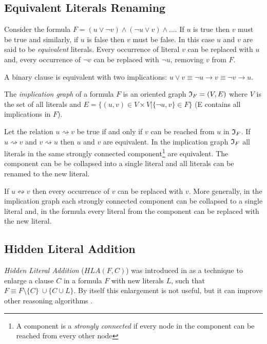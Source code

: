 \subsection{Equivalent Literals Renaming}
\label{ssec:eqlr}

Consider the formula $F = (u \lor \neg v) \land (\neg u \lor v) \land \ldots$.
If $u$ is true then $v$ must be true and similarly, if $u$ is false
then $v$ must be false. In this case $u$ and $v$ are said to be
\emph{equivalent} literals. Every occurrence of literal $v$ can be
replaced with $u$ and, every occurrence of $\neg v$ can be replaced
with $\neg u$, removing $v$ from $F$.

\begin{myprop}
  A binary clause is equivalent with two implications:
  $u \lor v \equiv \neg u \rightarrow v \equiv \neg v \rightarrow u$.
\end{myprop}

\begin{mydef}
  The \emph{implication graph} of a formula $F$ is an oriented graph
  $\mathfrak{I}_F = (V, E)$ where $V$ is the set of all literals and $E = \{(u,
  v) \in V \times V | \{\neg u, v\} \in F\}$ (E contains all implications in $F$).
\end{mydef}

Let the relation $u \rightsquigarrow v$ be true if and only if
$v$ can be reached from $u$ in $\mathfrak{I}_F$.  If $u \rightsquigarrow v$
and $v \rightsquigarrow u$ then $u$ and $v$ are equivalent.  In the
implication graph $\mathfrak{I}_F$ all literals in the same strongly connected
component\footnote{A component is a \emph{strongly connected}
if every node in the component can be reached from every other node}
are equivalent. The component can be be collapsed into a single
literal and all literals can be renamed to the new literal.

\begin{myprop}
  If $u \leftrightsquigarrow v$ then every occurrence of $v$ can be replaced
  with $v$. More generally, in the implication graph each strongly
  connected component can be collapsed to a single literal and, in
  the formula every literal from the component can be replaced with
  the new literal.
\end{myprop}


\subsection{Hidden Literal Addition}
\label{ssec:hla}

\emph{Hidden Literal Addition} ($HLA(F, C)$) was introduced in
\cite{Heule:2010:CEP:1928380.1928406} as a technique to enlarge a clause $C$
in a formula $F$ with new literals $L$, such that $F \equiv F \setminus \{C\} \
\cup \{ C \cup L \}$. By itself this enlargement is not useful, but it
can improve other reasoning algorithms \cite{Heule_coveredclause}.

